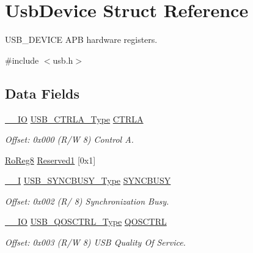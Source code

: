 \hypertarget{struct_usb_device}{}\section{Usb\+Device Struct Reference}
\label{struct_usb_device}


U\+S\+B\+\_\+\+D\+E\+V\+I\+CE A\+PB hardware registers.  




{\ttfamily \#include $<$usb.\+h$>$}

\subsection*{Data Fields}
\begin{DoxyCompactItemize}
\item 
\mbox{\hyperlink{core__cm0plus_8h_aec43007d9998a0a0e01faede4133d6be}{\+\_\+\+\_\+\+IO}} \mbox{\hyperlink{union_u_s_b___c_t_r_l_a___type}{U\+S\+B\+\_\+\+C\+T\+R\+L\+A\+\_\+\+Type}} \mbox{\hyperlink{struct_usb_device_aa15f86099ea2915cc8667b8ba3980a91}{C\+T\+R\+LA}}
\begin{DoxyCompactList}\small\item\em Offset\+: 0x000 (R/W 8) Control A. \end{DoxyCompactList}\item 
\mbox{\hyperlink{group___s_a_m_d21_e15_a__definitions_ga0d957f1433aaf5d70e4dc2b68288442d}{Ro\+Reg8}} \mbox{\hyperlink{struct_usb_device_a092866123ac46d0985136e4dca2f36f4}{Reserved1}} \mbox{[}0x1\mbox{]}
\item 
\mbox{\hyperlink{core__cm0plus_8h_af63697ed9952cc71e1225efe205f6cd3}{\+\_\+\+\_\+I}} \mbox{\hyperlink{union_u_s_b___s_y_n_c_b_u_s_y___type}{U\+S\+B\+\_\+\+S\+Y\+N\+C\+B\+U\+S\+Y\+\_\+\+Type}} \mbox{\hyperlink{struct_usb_device_a207c0e2e615d2c9a63a3cd1f81d252f7}{S\+Y\+N\+C\+B\+U\+SY}}
\begin{DoxyCompactList}\small\item\em Offset\+: 0x002 (R/ 8) Synchronization Busy. \end{DoxyCompactList}\item 
\mbox{\hyperlink{core__cm0plus_8h_aec43007d9998a0a0e01faede4133d6be}{\+\_\+\+\_\+\+IO}} \mbox{\hyperlink{union_u_s_b___q_o_s_c_t_r_l___type}{U\+S\+B\+\_\+\+Q\+O\+S\+C\+T\+R\+L\+\_\+\+Type}} \mbox{\hyperlink{struct_usb_device_a9df8751b364843c227b690917f10a4b4}{Q\+O\+S\+C\+T\+RL}}
\begin{DoxyCompactList}\small\item\em Offset\+: 0x003 (R/W 8) U\+SB Quality Of Service. \end{DoxyCompactList}\item 

\end{DoxyCompactItemize}
